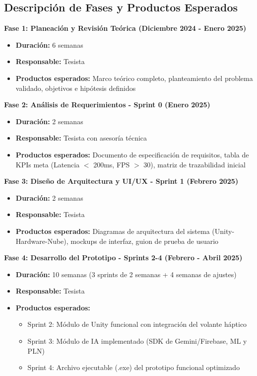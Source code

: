 \subsection{Descripción de Fases y Productos Esperados}

\textbf{Fase 1: Planeación y Revisión Teórica (Diciembre 2024 - Enero 2025)}
\begin{itemize}
    \item \textbf{Duración:} 6 semanas
    \item \textbf{Responsable:} Tesista
    \item \textbf{Productos esperados:} Marco teórico completo, planteamiento del problema validado, objetivos e hipótesis definidos
\end{itemize}

\textbf{Fase 2: Análisis de Requerimientos - Sprint 0 (Enero 2025)}
\begin{itemize}
    \item \textbf{Duración:} 2 semanas
    \item \textbf{Responsable:} Tesista con asesoría técnica
    \item \textbf{Productos esperados:} Documento de especificación de requisitos, tabla de KPIs meta (Latencia $<$ 200ms, FPS $>$ 30), matriz de trazabilidad inicial
\end{itemize}

\textbf{Fase 3: Diseño de Arquitectura y UI/UX - Sprint 1 (Febrero 2025)}
\begin{itemize}
    \item \textbf{Duración:} 2 semanas
    \item \textbf{Responsable:} Tesista
    \item \textbf{Productos esperados:} Diagramas de arquitectura del sistema (Unity-Hardware-Nube), mockups de interfaz, guion de prueba de usuario
\end{itemize}

\textbf{Fase 4: Desarrollo del Prototipo - Sprints 2-4 (Febrero - Abril 2025)}
\begin{itemize}
    \item \textbf{Duración:} 10 semanas (3 sprints de 2 semanas + 4 semanas de ajustes)
    \item \textbf{Responsable:} Tesista
    \item \textbf{Productos esperados:} 
    \begin{itemize}
        \item Sprint 2: Módulo de Unity funcional con integración del volante háptico
        \item Sprint 3: Módulo de IA implementado (SDK de Gemini/Firebase, ML y PLN)
        \item Sprint 4: Archivo ejecutable (.exe) del prototipo funcional optimizado
    \end{itemize}
\end{itemize}

